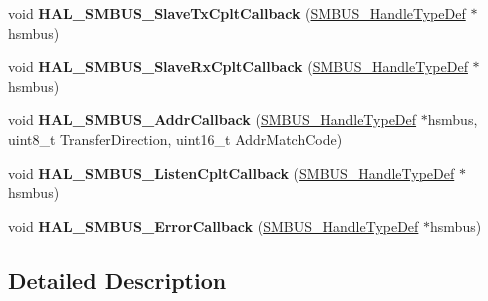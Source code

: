 \begin{DoxyCompactItemize}
void {\bfseries H\+A\+L\+\_\+\+S\+M\+B\+U\+S\+\_\+\+Slave\+Tx\+Cplt\+Callback} (\hyperlink{struct_s_m_b_u_s___handle_type_def}{S\+M\+B\+U\+S\+\_\+\+Handle\+Type\+Def} $\ast$hsmbus)
\item 
\mbox{\label{group___s_m_b_u_s___i_r_q___handler__and___callbacks_gabd6235177a6ab889bbf5792a0d03cda1}} 
void {\bfseries H\+A\+L\+\_\+\+S\+M\+B\+U\+S\+\_\+\+Slave\+Rx\+Cplt\+Callback} (\hyperlink{struct_s_m_b_u_s___handle_type_def}{S\+M\+B\+U\+S\+\_\+\+Handle\+Type\+Def} $\ast$hsmbus)
\item 
\mbox{\label{group___s_m_b_u_s___i_r_q___handler__and___callbacks_ga6901a2dce77b77f0566565162963b8ad}} 
void {\bfseries H\+A\+L\+\_\+\+S\+M\+B\+U\+S\+\_\+\+Addr\+Callback} (\hyperlink{struct_s_m_b_u_s___handle_type_def}{S\+M\+B\+U\+S\+\_\+\+Handle\+Type\+Def} $\ast$hsmbus, uint8\+\_\+t Transfer\+Direction, uint16\+\_\+t Addr\+Match\+Code)
\item 
\mbox{\label{group___s_m_b_u_s___i_r_q___handler__and___callbacks_gac31d20bd9b7bfd1cbb23075ddbb46f25}} 
void {\bfseries H\+A\+L\+\_\+\+S\+M\+B\+U\+S\+\_\+\+Listen\+Cplt\+Callback} (\hyperlink{struct_s_m_b_u_s___handle_type_def}{S\+M\+B\+U\+S\+\_\+\+Handle\+Type\+Def} $\ast$hsmbus)
\item 
\mbox{\label{group___s_m_b_u_s___i_r_q___handler__and___callbacks_ga0712f11a6832a4007f96e7b91b29293c}} 
void {\bfseries H\+A\+L\+\_\+\+S\+M\+B\+U\+S\+\_\+\+Error\+Callback} (\hyperlink{struct_s_m_b_u_s___handle_type_def}{S\+M\+B\+U\+S\+\_\+\+Handle\+Type\+Def} $\ast$hsmbus)
\end{DoxyCompactItemize}


\subsection{Detailed Description}

